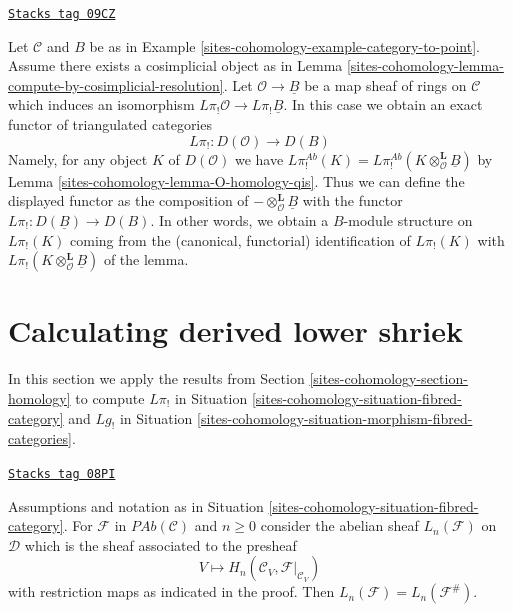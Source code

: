 \begin{remark}
\label{sites-cohomology-remark-O-homology-B-homology-general}
\href{https://stacks.math.columbia.edu/tag/09CZ}{\texttt{Stacks tag 09CZ}}

Let $\mathcal{C}$ and $B$ be as in Example \ref{sites-cohomology-example-category-to-point}.
Assume there exists a cosimplicial object as in
Lemma \ref{sites-cohomology-lemma-compute-by-cosimplicial-resolution}.
Let $\mathcal{O} \to \underline{B}$ be a map sheaf of rings on
$\mathcal{C}$ which induces an isomorphism
$L\pi_!\mathcal{O} \to L\pi_!\underline{B}$.
In this case we obtain an exact functor of triangulated categories
$$
L\pi_! : D(\mathcal{O}) \longrightarrow D(B)
$$
Namely, for any object $K$ of $D(\mathcal{O})$ we have
$L\pi^{\textit{Ab}}_!(K) =
L\pi^{\textit{Ab}}_!(K \otimes_{\mathcal{O}}^\mathbf{L} \underline{B})$
by Lemma \ref{sites-cohomology-lemma-O-homology-qis}.
Thus we can define the displayed functor as the composition of
$- \otimes^\mathbf{L}_\mathcal{O} \underline{B}$ with the functor
$L\pi_! : D(\underline{B}) \to D(B)$.
In other words, we obtain a $B$-module structure on $L\pi_!(K)$ coming
from the (canonical, functorial) identification of $L\pi_!(K)$ with
$L\pi_!(K \otimes_\mathcal{O}^\mathbf{L} \underline{B})$ of the lemma.
\end{remark}

\section{Calculating derived lower shriek}
\label{sites-cohomology-section-calculate}
In this section we apply the results from
Section \ref{sites-cohomology-section-homology}
to compute
$L\pi_!$ in Situation \ref{sites-cohomology-situation-fibred-category} and
$Lg_!$ in Situation \ref{sites-cohomology-situation-morphism-fibred-categories}.

\begin{lemma}
\label{sites-cohomology-lemma-compute-left-derived-pi-shriek-pre}
\href{https://stacks.math.columbia.edu/tag/08PI}{\texttt{Stacks tag 08PI}}

Assumptions and notation as in Situation \ref{sites-cohomology-situation-fibred-category}.
For $\mathcal{F}$ in $\textit{PAb}(\mathcal{C})$ and $n \geq 0$
consider the abelian sheaf $L_n(\mathcal{F})$ on $\mathcal{D}$
which is the sheaf associated to the presheaf
$$
V \longmapsto H_n(\mathcal{C}_V, \mathcal{F}|_{\mathcal{C}_V})
$$
with restriction maps as indicated in the proof. Then
$L_n(\mathcal{F}) = L_n(\mathcal{F}^\#)$.
\end{lemma}

